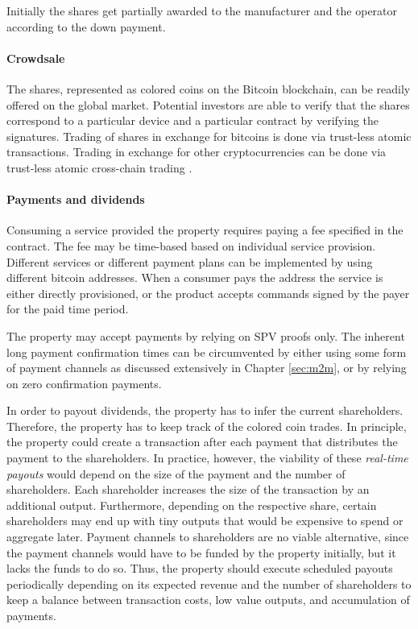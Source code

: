 Initially the shares get partially awarded to the manufacturer and the operator according to the down payment.

\paragraph{Crowdsale}

The shares, represented as colored coins on the Bitcoin blockchain, can be readily offered on the global market. Potential investors are able to verify that the shares correspond to a particular device and a particular contract by verifying the signatures. Trading of shares in exchange for bitcoins is done via trust-less atomic transactions. Trading in exchange for other cryptocurrencies can be done via trust-less atomic cross-chain trading \parencite{atomiccrosschaintrading}.

\paragraph{Payments and dividends}

Consuming a service provided the property requires paying a fee specified in the contract. The fee may be time-based based on individual service provision. Different services or different payment plans can be implemented by using different bitcoin addresses. When a consumer pays the address the service is either directly provisioned, or the product accepts commands signed by the payer for the paid time period.

The property may accept payments by relying on SPV proofs only. The inherent long payment confirmation times can be circumvented by either using some form of payment channels as discussed extensively in Chapter \ref{sec:m2m}, or by relying on zero confirmation payments.

In order to payout dividends, the property has to infer the current shareholders. Therefore, the property has to keep track of the colored coin trades. In principle, the property could create a transaction after each payment that distributes the payment to the shareholders. In practice, however, the viability of these \emph{real-time payouts} would depend on the size of the payment and the number of shareholders. Each shareholder increases the size of the transaction by an additional output. Furthermore, depending on the respective share, certain shareholders may end up with tiny outputs that would be expensive to spend or aggregate later.
Payment channels to shareholders are no viable alternative, since the payment channels would have to be funded by the property initially, but it lacks the funds to do so. Thus, the property should execute scheduled payouts periodically depending on its expected revenue and the number of shareholders to keep a balance between transaction costs, low value outputs, and accumulation of payments.

